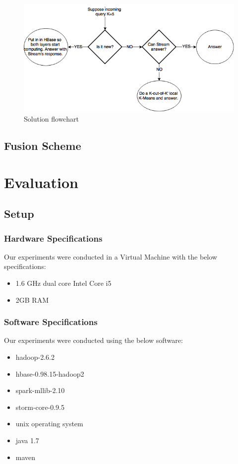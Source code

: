 \documentclass{lmproj}
\begin{document}
\begin{figure}[H]
	\centering	
	\includegraphics[scale=0.5]{usecase}
	\caption{Solution flowchart}
\end{figure}


\section{Fusion Scheme}
\label{kmeans}




\chapter{Evaluation}
\label{evaluation}

\section{Setup}
\label{evaluation}

\subsection{Hardware Specifications}
Our experiments were conducted in a Virtual Machine with the below specifications:
\begin{itemize}
	\item 1.6 GHz dual core Intel Core i5
	\item 2GB RAM
\end{itemize}

\subsection{Software Specifications}
Our experiments were conducted using the below software:
\begin{itemize}
	\item hadoop-2.6.2
	\item hbase-0.98.15-hadoop2
	\item spark-mllib-2.10
	\item storm-core-0.9.5
	\item unix operating system
	\item java 1.7
	\item maven
\end{itemize}
\end{document}
